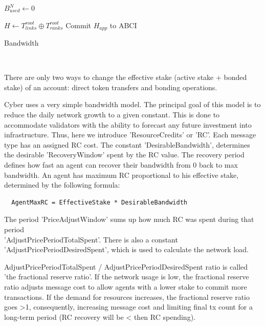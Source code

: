 \documentclass[8pt,oneside]{amsart}
\newcommand{\code}[1]{{\PlayBold #1}}
\begin{document}
\begin{algorithm}
$B^{N}_{used} \leftarrow 0$\;

\BlankLine
$H \leftarrow T^{root}_{links} \oplus T^{root}_{ranks}$\;
Commit $H_{app}$ to ABCI\;
\caption{Bandwidth}\label{algo_protocol}
\end{algorithm}\

There are only two ways to change the effective stake (active stake + bonded stake) of an account: direct token transfers and bonding operations.

Cyber uses a very simple bandwidth model. The principal goal of this model is to reduce the daily network growth to a given constant. This is done to accommodate validators with the ability to forecast any future investment into infrastructure. Thus, here we introduce 'ResourceCredits' or 'RC'. Each message type has an assigned RC cost. The constant 'DesirableBandwidth', determines the desirable 'RecoveryWindow' spent by the RC value. The recovery period defines how fast an agent can recover their bandwidth from 0 back to max bandwidth. An agent has maximum RC proportional to his effective stake, determined by the following formula:

\begin{lstlisting}
  AgentMaxRC = EffectiveStake * DesirableBandwidth
\end{lstlisting}

The period 'PriceAdjustWindow' sums up how much RC was spent during that period\\ 'AdjustPricePeriodTotalSpent'. There is also a constant 'AdjustPricePeriodDesiredSpent', which is used to calculate the network load.

\code{AdjustPricePeriodTotalSpent / AdjustPricePeriodDesiredSpent} ratio is called 'the fractional reserve ratio'. If the network usage is low, the fractional reserve ratio adjusts message cost to allow agents with a lower stake to commit more transactions. If the demand for resources increases, the fractional reserve ratio goes \code{>1}, consequently, increasing message cost and limiting final tx count for a long-term period (RC recovery will be \code{<} then RC spending).
\end{document}
